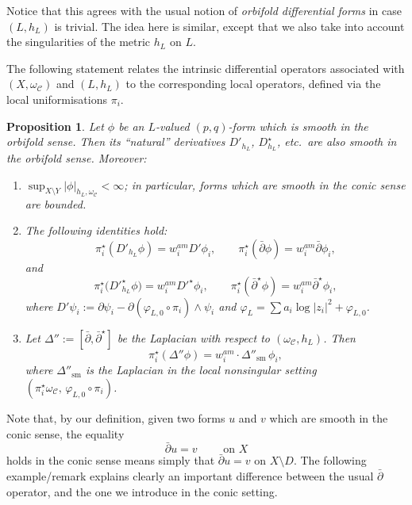 \documentclass[english]{amsart}
\newcommand{\cC}{\mathcal{C}}
\newcommand{\dbar}{\bar \partial}
\newtheorem{proposition}[thm]{Proposition}
\numberwithin{equation}{thm}
\begin{document}
Notice that this agrees with the usual notion of \emph{orbifold differential forms} in case $(L, h_L)$ is trivial. The idea here is similar, except that we also take into account the singularities of the metric $h_L$ on $L$.

The following statement relates the intrinsic differential operators associated with $(X,\omega_{\cC})$ and $(L,h_L)$ to the corresponding local operators, defined via the local uniformisations $\pi_i$.

\begin{proposition}\label{orbderiv}\cite[Prop 2.17]{JCMP}
	Let $\phi$ be an $L$-valued $(p,q)$-form which is smooth in the orbifold sense.
	Then its ``natural'' derivatives $D'_{h_L}$, $D_{h_L}^\star$, etc.\ are also smooth in the orbifold sense. Moreover:
	\begin{enumerate}
		\smallskip
		\item[\rm (1)] $\sup_{X\setminus Y} |\phi|_{h_L,\omega_{\cC}}<\infty$; in particular, forms which are smooth in the conic sense are bounded.
		\smallskip
		\item[\rm (2)] The following identities hold:
		\[
		\pi_i^\star(D'_{h_L}\phi)= w_i^{am} D'\phi_i, \qquad
		\pi_i^\star(\dbar \phi)= w_i^{am} \dbar \phi_i,
		\]
		and
		\[
		\pi_i^\star\bigl({D'}_{h_L}^{\star}\phi\bigr)= w_i^{am} {D'}^\star \phi_i,\qquad
		\pi_i^\star(\dbar^\star \phi)= w_i^{am} \dbar^\star \phi_i,
		\]
		where $D'\psi_i:=\partial \psi_i - \partial(\varphi_{L,0}\circ \pi_i)\wedge \psi_i$ and
		$\varphi_L=\sum a_i \log|z_i|^2 + \varphi_{L,0}$.
		\item[\rm (3)] Let $\Delta'' := [\dbar,\dbar^\star]$ be the Laplacian with respect to $(\omega_{\cC},h_L)$. Then
		\[
		\pi_i^\star(\Delta'' \phi)= w_i^{am}\cdot \Delta''_{\mathrm{sm}}\,\phi_i,
		\]
		where $\Delta''_{\mathrm{sm}}$ is the Laplacian in the local nonsingular setting $(\pi_i^\star \omega_{\cC},\, \varphi_{L,0}\circ \pi_i)$.
	\end{enumerate}
\end{proposition}

Note that, by our definition, given two forms $u$ and $v$ which are smooth in the conic sense,  
the equality
\[
\dbar u = v \qquad\text{ on } X
\]
holds in the conic sense means simply that $\dbar u = v$ on $X \setminus D$.
The following example/remark explains clearly an important difference between the usual $\dbar$ operator, and the one we introduce in the conic setting. 
\end{document}
